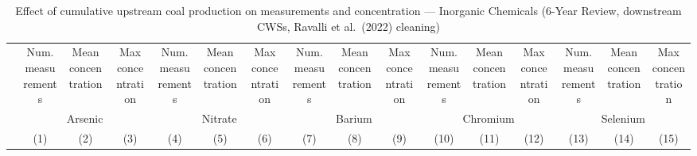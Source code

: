 
\begin{table}[htbp]
   
   \caption{\label{tab:6yr_huc02fe_cnt_inorg_ravalli} Effect of cumulative upstream coal production on measurements and concentration --- Inorganic Chemicals (6-Year Review, downstream CWSs, Ravalli et al.~(2022) cleaning)}
   \bigskip
   
   \centering
   
   \begin{adjustbox}{width = \textwidth, center}
      
      
      \begin{tabular}{lccccccccccccccc}
         \toprule
         
                                             & Num. measurements & Mean concentration & Max concentration & Num. measurements & Mean concentration & Max concentration & Num. measurements & Mean concentration & Max concentration & Num. measurements & Mean concentration    & Max concentration     & Num. measurements & Mean concentration & Max concentration\\  
         
          & \multicolumn{3}{c}{Arsenic} & \multicolumn{3}{c}{Nitrate} & \multicolumn{3}{c}{Barium} & \multicolumn{3}{c}{Chromium} & \multicolumn{3}{c}{Selenium} \\ 
         
                                             & (1)               & (2)                & (3)               & (4)               & (5)                & (6)               & (7)               & (8)                & (9)               & (10)              & (11)                  & (12)                  & (13)              & (14)               & (15)\\  
         

\end{tabular}
\end{adjustbox}
\end{table}
